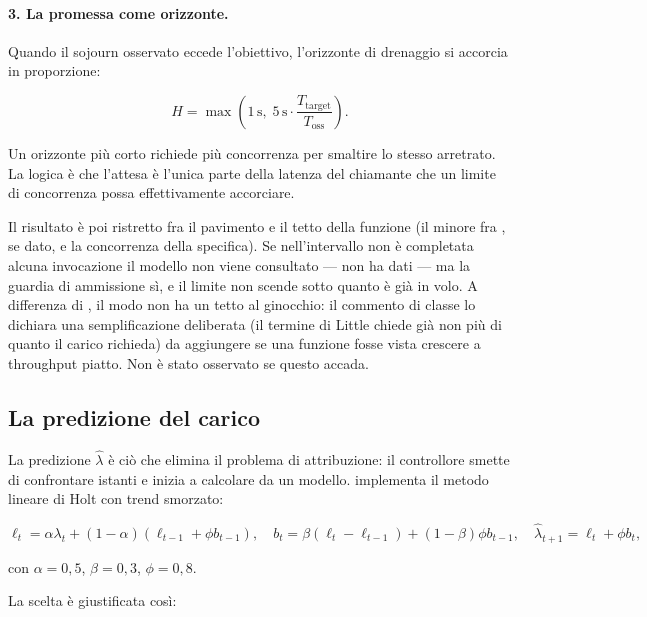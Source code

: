 \paragraph{3. La promessa come orizzonte.} Quando il sojourn osservato eccede
l'obiettivo, l'orizzonte di drenaggio si accorcia in proporzione:

\[
  H = \max\left(1\,\mathrm{s},\; 5\,\mathrm{s} \cdot
      \frac{T_{\text{target}}}{T_{\text{oss}}}\right).
\]

Un orizzonte pi\`u corto richiede pi\`u concorrenza per smaltire lo stesso
arretrato. La logica \`e che l'attesa \`e l'unica parte della latenza del
chiamante che un limite di concorrenza possa effettivamente accorciare.

Il risultato \`e poi ristretto fra il pavimento e il tetto della funzione (il
minore fra , se dato, e la concorrenza della
specifica). Se nell'intervallo non \`e completata alcuna invocazione il modello
non viene consultato --- non ha dati --- ma la guardia di ammissione s\`i, e il
limite non scende sotto quanto \`e gi\`a in volo. A differenza di ,
il modo non ha un tetto al ginocchio: il commento di classe lo dichiara una
semplificazione deliberata (il termine di Little chiede gi\`a non pi\`u di quanto il
carico richieda) da aggiungere se una funzione fosse vista crescere a throughput
piatto. Non \`e stato osservato se questo accada.
\begin{damisurare}
\end{damisurare}

\subsection{La predizione del carico}

La predizione $\hat{\lambda}$ \`e ci\`o che elimina il problema di attribuzione:
il controllore smette di confrontare istanti e inizia a calcolare da un modello.
 implementa il metodo lineare di Holt con trend smorzato:

\[
  \ell_t = \alpha \lambda_t + (1-\alpha)(\ell_{t-1} + \phi b_{t-1}),
  \quad
  b_t = \beta(\ell_t - \ell_{t-1}) + (1-\beta)\phi b_{t-1},
  \quad
  \hat{\lambda}_{t+1} = \ell_t + \phi b_t,
\]

con $\alpha = 0{,}5$, $\beta = 0{,}3$, $\phi = 0{,}8$.

La scelta \`e giustificata cos\`i:

